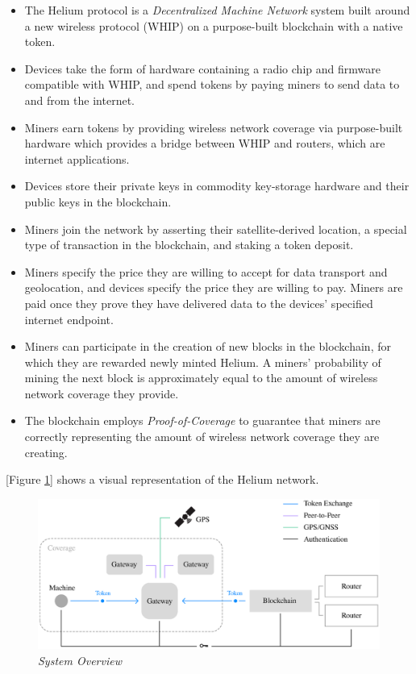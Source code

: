 \documentclass[10pt, nonatbib, nocopyrightspace, reprint]{sigplanconf}
\begin{document}
\begin{itemize}
    \item The Helium protocol is a \emph{Decentralized Machine Network} system built around a new wireless protocol (WHIP) on a purpose-built blockchain with a native token.
    \item Devices take the form of hardware containing a radio chip and firmware compatible with WHIP, and spend tokens by paying miners to send data to and from the internet.
    \item Miners earn tokens by providing wireless network coverage via purpose-built hardware which provides a bridge between WHIP and routers, which are internet applications.
    \item Devices store their private keys in commodity key-storage hardware and their public keys in the blockchain.
    \item Miners join the network by asserting their satellite-derived location, a special type of transaction in the blockchain, and staking a token deposit.
    \item Miners specify the price they are willing to accept for data transport and geolocation, and devices specify the price they are willing to pay. Miners are paid once they prove they have delivered data to the devices' specified internet endpoint.
    \item Miners can participate in the creation of new blocks in the blockchain, for which they are rewarded newly minted Helium. A miners' probability of mining the next block is approximately equal to the amount of wireless network coverage they provide.
    \item The blockchain employs \emph{Proof-of-Coverage} to guarantee that miners are correctly representing the amount of wireless network coverage they are creating.
\end{itemize}

[Figure \ref{fig:system}] shows a visual representation of the Helium network.

\begin{figure}[ht]
    \begin{center}
          \includegraphics[width=\textwidth]{schematic.eps}
          \caption{\emph{System Overview}}
          \label{fig:system}
     \end{center}
\end{figure}
\end{document}
